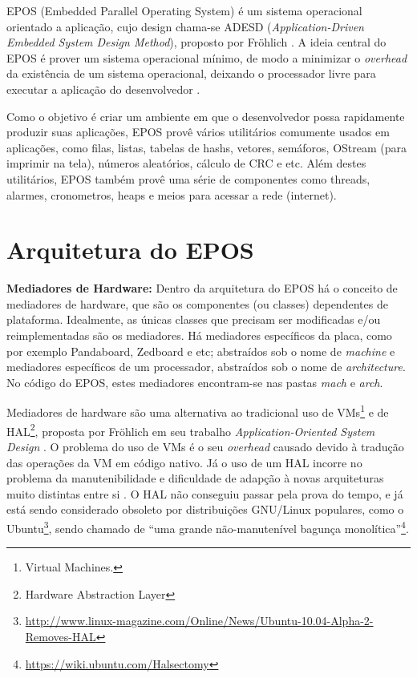 \documentclass{ufscThesis/ufscThesis} %
\begin{document}
EPOS (Embedded Parallel Operating System) é um sistema operacional orientado a aplicação, cujo design chama-se ADESD (\emph{Application-Driven Embedded System Design Method}), proposto por Fröhlich \cite{guto_thesis}. A ideia central do EPOS é prover um sistema operacional mínimo, de modo a minimizar o \emph{overhead} da existência de um sistema operacional, deixando o processador livre para executar a aplicação do desenvolvedor \cite{epos_user_guide}.

Como o objetivo é criar um ambiente em que o desenvolvedor possa rapidamente produzir suas aplicações, EPOS provê vários utilitários comumente usados em aplicações, como filas, listas, tabelas de hashs, vetores, semáforos, OStream (para imprimir na tela), números aleatórios, cálculo de CRC e etc. Além destes utilitários, EPOS também provê uma série de componentes como threads, alarmes, cronometros, heaps e meios para acessar a rede (internet).

\section{Arquitetura do EPOS}

\textbf{Mediadores de Hardware:} Dentro da arquitetura do EPOS há o conceito de mediadores de hardware, que são os componentes (ou classes) dependentes de plataforma. Idealmente, as únicas classes que precisam ser modificadas e/ou reimplementadas são os mediadores. Há mediadores específicos da placa, como por exemplo Pandaboard, Zedboard e etc; abstraídos sob o nome de \emph{machine} e mediadores específicos de um processador, abstraídos sob o nome de \emph{architecture}. No código do EPOS, estes mediadores encontram-se nas pastas \emph{mach} e \emph{arch}.

Mediadores de hardware são uma alternativa ao tradicional uso de VMs\footnote{Virtual Machines.} e de HAL\footnote{Hardware Abstraction Layer}, proposta por Fröhlich em seu trabalho \emph{Application-Oriented System Design} \cite{guto_thesis}. O problema do uso de VMs é o seu \emph{overhead} causado devido à tradução das operações da VM em código nativo. Já o uso de um HAL incorre no problema da manutenibilidade e dificuldade de adapção à novas arquiteturas muito distintas entre si \cite{hw_mediators}. O HAL não conseguiu passar pela prova do tempo, e já está sendo considerado obsoleto por distribuições GNU/Linux populares, como o 
Ubuntu\footnote{\url{http://www.linux-magazine.com/Online/News/Ubuntu-10.04-Alpha-2-Removes-HAL}}, sendo chamado de ``uma grande não-manutenível bagunça monolítica''\footnote{\url{https://wiki.ubuntu.com/Halsectomy}}.
\end{document}
